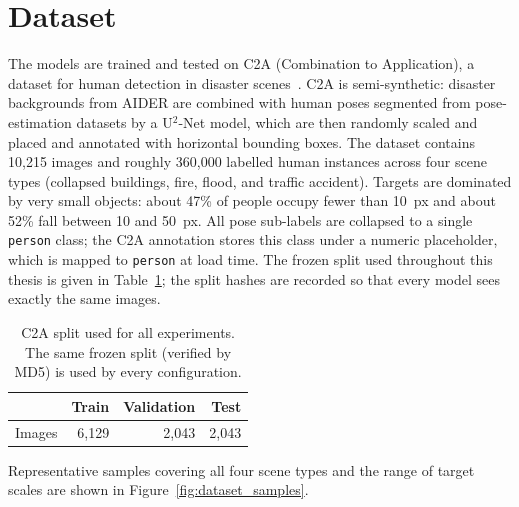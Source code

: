 \section{Dataset}
The models are trained and tested on C2A (Combination to Application), a dataset
for human detection in disaster scenes~\cite{nihal2024c2a}. C2A is semi-synthetic:
disaster backgrounds from AIDER are combined with human poses segmented from
pose-estimation datasets by a U$^2$-Net model, which are then randomly scaled and
placed and annotated with horizontal bounding boxes. The dataset contains 10{,}215
images and roughly 360{,}000 labelled human instances across four scene types
(collapsed buildings, fire, flood, and traffic accident). Targets are dominated by
very small objects: about 47\% of people occupy fewer than 10~px and about 52\%
fall between 10 and 50~px. All pose sub-labels are collapsed to a single
\texttt{person} class; the C2A annotation stores this class under a numeric
placeholder, which is mapped to \texttt{person} at load time. The frozen split
used throughout this thesis is given in Table~\ref{tab:split}; the split hashes are
recorded so that every model sees exactly the same images.

\begin{table}[tbp]
  \centering
  \caption{C2A split used for all experiments. The same frozen split (verified by
  MD5) is used by every configuration.}
  \label{tab:split}
  \begin{tabular}{@{}l r r r@{}}
    \toprule
    & Train & Validation & Test \\
    \midrule
    Images & 6{,}129 & 2{,}043 & 2{,}043 \\
    \bottomrule
  \end{tabular}
\end{table}

Representative samples covering all four scene types and the range of target
scales are shown in Figure~\ref{fig:dataset_samples}.

